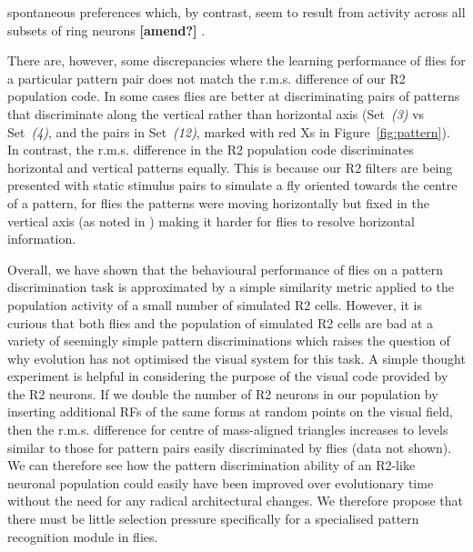 spontaneous preferences which, by contrast, seem to result from activity across all subsets of ring neurons {\bf [amend?]} \cite{Solanki2015}.

There are, however, some discrepancies where the learning performance of flies for a particular pattern pair does not match the r.m.s. difference of our R2 population code. In some cases flies are better at discriminating pairs of patterns that discriminate along the vertical rather than horizontal axis (Set~\emph{(3)} vs Set~\emph{(4)}, and the pairs in Set~\emph{(12)}, marked with red Xs in Figure~\ref{fig:pattern}). In contrast, the r.m.s. difference in the R2 population code discriminates horizontal and vertical patterns equally. This is because our R2 filters are being presented with static stimulus pairs to simulate a fly oriented towards the centre of a pattern, for flies the patterns were moving horizontally but fixed in the vertical axis (as noted in \cite{Ernst1999}) making it harder for flies to resolve horizontal information.

Overall, we have shown that the behavioural performance of flies on a pattern discrimination task is approximated by a simple similarity metric applied to the population activity of a small number of simulated R2 cells. However, it is curious that both flies and the population of simulated R2 cells are bad at a variety of seemingly simple pattern discriminations which raises the question of why evolution has not optimised the visual system for this task. A simple thought experiment is helpful in considering the purpose of the visual code provided by the R2 neurons. If we double the number of R2 neurons in our population by inserting additional RFs of the same forms at random points on the visual field, then the r.m.s. difference for centre of mass-aligned triangles increases to levels similar to those for pattern pairs easily discriminated by flies (data not shown). We can therefore see how the pattern discrimination ability of an R2-like neuronal population could easily have been improved over evolutionary time without the need for any radical architectural changes. We therefore propose that there must be little selection pressure specifically for a specialised pattern recognition module in flies.

\begin{comment}
Sig:
above: 8; below: 0; eq: 0; not given: 0; tot: 8
------
NS:
above: 5; below: 13; eq: 0; not given: 1; tot: 19
------
Sig not given:
above: 3; eq: 3; below: 0; not given: 3; tot: 9
------
tot tot: 36
\end{comment}

